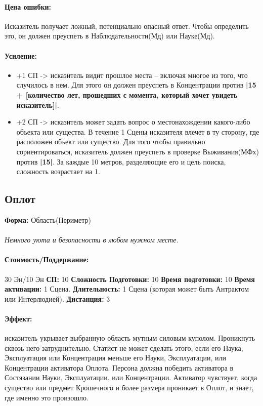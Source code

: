 \paragraph{Цена ошибки: }Исказитель получает ложный, потенциально опасный ответ. Чтобы определить это, он должен преуспеть в Наблюдательности(Мд) или Науке(Мд).
\paragraph{Усиление:}
\begin{itemize}
\item+1 СП -> исказитель видит прошлое места – включая многое из того, что случилось в нем. Для этого он должен преуспеть в Концентрации против 
\textbf{|15 + [количество лет, прошедших с момента, который хочет увидеть исказитель]|}.
\item+2 СП -> исказитель может задать вопрос о местонахождении какого-либо объекта или существа. В течение 1 Сцены исказителя влечет в ту сторону, где расположен объект или существо. Для того чтобы правильно сориентироваться, исказитель должен преуспеть в проверке Выживания(МФх) против 
\textbf{|15|}. За каждые 10 метров, разделяющие его и цель поиска, сложность возрастает на 1.
\end{itemize}
\subsection{Оплот}
\textbf{Форма: }Область(Периметр)
\paragraph{} 
\textit{Немного уюта и безопасности в любом нужном месте.}
\paragraph{Стоимость/Поддержание: }30 Эн/10 Эн
\leavevmode
\newline 
\textbf{СП: }10
\leavevmode
\newline 
\textbf{Сложность Подготовки: }10
\leavevmode
\newline 
\textbf{Время подготовки: }10
\leavevmode
\newline 
\textbf{Время активации: }1 Сцена.
\leavevmode
\newline 
\textbf{Длительность: }1 Сцена (которая может быть Антрактом или Интерлюдией).
\leavevmode
\newline 
\textbf{Дистанция: }3
\paragraph{Эффект: }исказитель укрывает выбранную область мутным силовым куполом. Проникнуть сквозь него затруднительно. Статист не может сделать этого, если его  Наука, Эксплуатация или Концентрация меньше его Науки, Эксплуатации, или Концентрации активатора Оплота. Персона должна победить активатора в Состязании Науки, Эксплуатации, или Концентрации. 
\newline Активатор чувствует, когда существо или предмет Крошечного и более размера проникает в Оплот, и знает, где именно это произошло.
